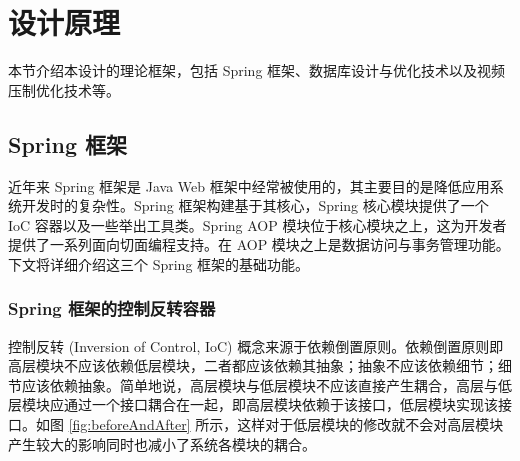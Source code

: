 \chapter{设计原理}\label{sec:theory}

本节介绍本设计的理论框架，包括 Spring 框架、数据库设计与优化技术以及视频压制优化技术等。

\section{Spring 框架}

近年来 Spring 框架是 Java Web 框架中经常被使用的，其主要目的是降低应用系统开发时的复杂性。Spring 框架构建基于其核心，Spring 核心模块提供了一个 IoC 容器以及一些举出工具类。Spring AOP 模块位于核心模块之上，这为开发者提供了一系列面向切面编程支持。在 AOP 模块之上是数据访问与事务管理功能\cite{walls2005spring}。下文将详细介绍这三个 Spring 框架的基础功能。

\subsection{Spring 框架的控制反转容器}

控制反转 (Inversion of Control, IoC) 概念来源于依赖倒置原则。依赖倒置原则即高层模块不应该依赖低层模块，二者都应该依赖其抽象；抽象不应该依赖细节；细节应该依赖抽象\cite{gamma1995design}。简单地说，高层模块与低层模块不应该直接产生耦合，高层与低层模块应通过一个接口耦合在一起，即高层模块依赖于该接口，低层模块实现该接口。如图 \ref{fig:beforeAndAfter} 所示，这样对于低层模块的修改就不会对高层模块产生较大的影响同时也减小了系统各模块的耦合。

